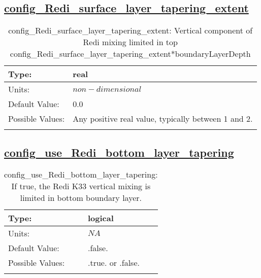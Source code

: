 \subsection[config\_Redi\_surface\_layer\_tapering\_extent]{\hyperref[sec:nm_tab_mesoscale_eddy_parameterization]{config\_Redi\_surface\_layer\_tapering\_extent}}
\label{subsec:nm_sec_config_Redi_surface_layer_tapering_extent}
\begin{center}
\begin{longtable}{| p{2.0in} || p{4.0in} |}
    \hline
    Type: & real \\
    \hline
    Units: & $non-dimensional$ \\
    \hline
    Default Value: & 0.0 \\
    \hline
    Possible Values: & Any positive real value, typically between 1 and 2. \\
    \hline
    \caption{config\_Redi\_surface\_layer\_tapering\_extent: Vertical component of Redi mixing limited in top config\_Redi\_surface\_layer\_tapering\_extent*boundaryLayerDepth}
\end{longtable}
\end{center}
\subsection[config\_use\_Redi\_bottom\_layer\_tapering]{\hyperref[sec:nm_tab_mesoscale_eddy_parameterization]{config\_use\_Redi\_bottom\_layer\_tapering}}
\label{subsec:nm_sec_config_use_Redi_bottom_layer_tapering}
\begin{center}
\begin{longtable}{| p{2.0in} || p{4.0in} |}
    \hline
    Type: & logical \\
    \hline
    Units: & $NA$ \\
    \hline
    Default Value: & .false. \\
    \hline
    Possible Values: & .true. or .false. \\
    \hline
    \caption{config\_use\_Redi\_bottom\_layer\_tapering: If true, the Redi K33 vertical mixing is limited in bottom boundary layer.}
\end{longtable}
\end{center}
